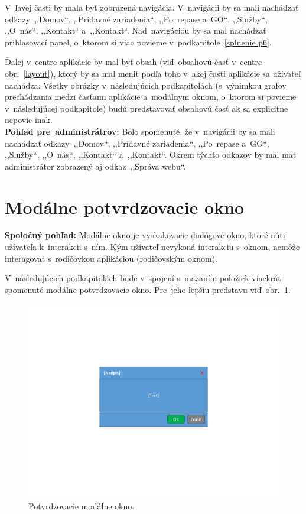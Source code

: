 V~ľavej časti by mala byť zobrazená navigácia. V~navigácii by sa mali nachádzať odkazy~,,Domov``, ,,Prídavné zariadenia``, ,,Po~repase a~GO``, ,,Služby``, ,,O~nás``, ,,Kontakt`` a~,,Kontakt``. Nad~navigáciou by sa mal nachádzať prihlasovací panel, o~ktorom si viac povieme v~podkapitole~\ref{splnenie p6}.

Ďalej v~centre aplikácie by mal byť obsah (viď~obsahovú časť v~centre obr.~\ref{layout}), ktorý by sa mal meniť podľa toho v~akej časti aplikácie sa užívateľ nachádza. Všetky obrázky v~následujúcich podkapitolách (s~výnimkou grafov prechádzania medzi časťami aplikácie a~modálnym oknom, o~ktorom si povieme v~následujúcej podkapitole) budú predstavovať obsahovú časť ak sa explicitne nepovie inak.\\

\textbf{Pohľad pre~administrátrov:} Bolo spomenuté, že v~navigácii by sa mali nachádzať odkazy~,,Domov``, ,,Prídavné zariadenia``, ,,Po~repase a~GO``, ,,Služby``, ,,O~nás``, ,,Kontakt`` a~,,Kontakt``. Okrem týchto odkazov by mal mať administrátor zobrazený aj odkaz~,,Správa webu``.

\section{Modálne potvrdzovacie okno}
\label{modalne potvrdzovacie okno}

\textbf{Spoločný pohľad:} \href{https://ux.stackexchange.com/questions/12045/what-is-a-modal-dialog-window}{Modálne okno} je vyskakovacie dialógové okno, ktoré núti užívateľa k~interakcii s~ním. Kým užívateľ nevykoná interakciu s~oknom, nemôže interagovať s~rodičovkou aplikáciou (rodičovským oknom).

V~následujúcich podkapitolách bude v~spojení s~mazaním položiek viackrát spomenuté modálne potvrdzovacie okno. Pre~jeho lepšiu predstavu viď~obr.~\ref{confirmation modal}.

\begin{figure}[H]\centering
\includegraphics[width=140mm]{../img/UI concept/confirmation modal}
\caption{Potvrdzovacie modálne okno.}
\label{confirmation modal}
\end{figure}

